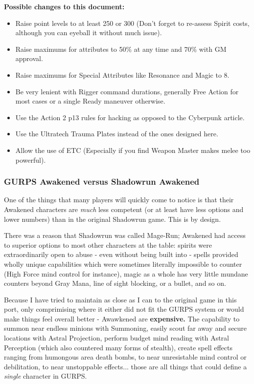 \begin{multicols*}{2}
	\textbf{Possible changes to this document:}
	\begin{itemize}
		\itemsep 0pt
		\item Raise point levels to at least 250 or 300 (Don't forget to re-assess Spirit costs, although you can eyeball it without much issue). 
		\item Raise maximums for attributes to 50\% at any time and 70\% with GM approval.
		\item Raise maximums for Special Attributes like Resonance and Magic to 8.
		\item Be very lenient with Rigger command durations, generally Free Action for most cases or a single Ready maneuver otherwise.
		\item Use the Action 2 p13 rules for hacking as opposed to the Cyberpunk article.
		\item Use the Ultratech Trauma Plates instead of the ones designed here.
		\item Allow the use of ETC (Especially if you find Weapon Master makes melee too powerful).
	\end{itemize}
	
	\subsubsection{GURPS Awakened versus Shadowrun Awakened}\label{gurps_awakened}
	
	One of the things that many players will quickly come to notice is that their Awakened characters are \textit{much} less competent (or at least have less options and lower numbers) than in the original Shadowrun game. This is by design. 
	
	There was a reason that Shadowrun was called Mage-Run; Awakened had access to superior options to most other characters at the table: spirits were extraordinarily open to abuse - even without being built into - spells provided wholly unique capabilities which were sometimes literally impossible to counter (High Force mind control for instance), magic as a whole has very little mundane counters beyond Gray Mana, line of sight blocking, or a bullet, and so on.
	
	Because I have tried to maintain as close as I can to the original game in this port, only comprimising where it either did not fit the GURPS system or would make things feel overall better - Awawkened are \textbf{expensive.} The capability to summon near endless minions with Summoning, easily scout far away and secure locations with Astral Projection, perform budget mind reading with Astral Perception (which also countered many forms of stealth), create spell effects ranging from humongous area death bombs, to near unresistable mind control or debilitation, to near unstoppable effects... those are all things that could define a \textit{single} character in GURPS.
	

\end{multicols*}
